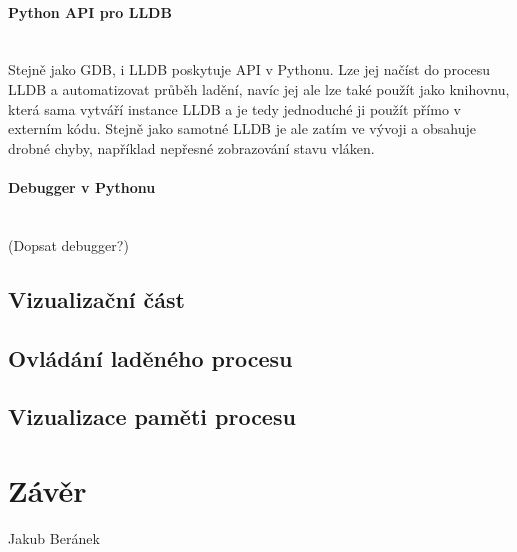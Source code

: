 \documentclass[bc,male,java,dept460]{diploma}						%
\newcommand{\lineparagraph}[1]{\paragraph{#1}\mbox{}\\}
\begin{document}
			\lineparagraph{Python API pro LLDB}
			Stejně jako GDB, i LLDB poskytuje API v Pythonu. Lze jej načíst do procesu LLDB a automatizovat průběh ladění, navíc jej ale lze také použít jako
			knihovnu, která sama vytváří instance LLDB a je tedy jednoduché ji použít přímo v externím kódu. Stejně jako samotné LLDB je ale zatím ve vývoji
			a obsahuje drobné chyby, například nepřesné zobrazování stavu vláken.
		
			\lineparagraph{Debugger v Pythonu}
			(Dopsat debugger?)
			
			
	\subsection{Vizualizační část}
	
	\subsection{Ovládání laděného procesu}
	\subsection{Vizualizace paměti procesu}

\section{Závěr}
\label{sec:Conclusion}

\bigskip
\begin{flushright}
Jakub Beránek
\end{flushright}

\printbibheading[title=Reference, heading=bibintoc]
\printbibliography[type=book,heading=subbibintoc,title={Knižní zdroje}]
\printbibliography[nottype=book,heading=subbibintoc,title={Online zdroje}]

\appendix
\clearpage
\end{document}

